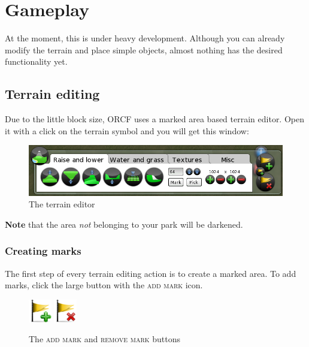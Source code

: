 \documentclass[a4paper]{article}
\newcommand{\ccaption}[1]{\textsc{#1}}
\newcommand{\note}[1]{\textbf{Note} #1 \par}
\begin{document}
\section{Gameplay}
At the moment, this is under heavy development. Although you can already modify the terrain and place simple objects, almost nothing
has the desired functionality yet.

\subsection{Terrain editing}
Due to the little block size, ORCF uses a marked area based terrain editor. Open it with a click on the terrain symbol and you will get
this window:

\begin{figure}[h]
  \begin{center}
    \includegraphics[width=140mm]{./images/terrain-01.png}
  \end{center}
  \caption{The terrain editor}
\end{figure}

\note{that the area \emph{not} belonging to your park will be darkened.}

\subsubsection{Creating marks}
The first step of every terrain editing action is to create a marked area. To add marks, click the large button with the \ccaption{add mark} icon.

\begin{figure}[h]
  \begin{center}
    \includegraphics[width=10mm]{../images/selection-add.png}
    \includegraphics[width=10mm]{../images/selection-delete.png}
  \end{center}
  \caption{The \ccaption{add mark} and \ccaption{remove mark} buttons}
\end{figure}
\end{document}
